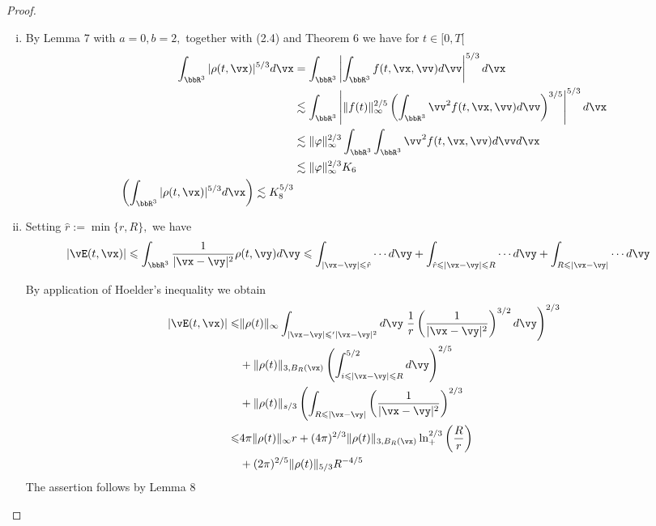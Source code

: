 \begin{proof}
    \begin{enumerate}[(i)]
        \item By Lemma 7 with $a=0, b=2,$ together with (2.4) and Theorem 6 we have for $t \in[0, T[$
        \[
        \begin{aligned}
        \int_{\bbR^{3}}|\rho(t, \vx)|^{5 / 3} d \vx &=\int_{\bbR^{3}}\left|\int_{\bbR^{3}} f(t, \vx, \vv) d \vv\right|^{5 / 3} d \vx \\
        & \lesssim \int_{\bbR^{3}}\left|\|f(t)\|_{\infty}^{2 / 5}\left(\int_{\bbR^{3}} \vv^{2} f(t, \vx, \vv) d \vv\right)^{3 / 5}\right|^{5 / 3} d \vx \\
        & \lesssim \|\varphi\|_{\infty}^{2 / 3} \int_{\bbR^{3}} \int_{\bbR^{3}} \vv^{2} f(t, \vx, \vv) d \vv d \vx \\
        & \lesssim \|\varphi\|_{\infty}^{2 / 3} K_{6}\\
        \left(\int_{\bbR^{3}}|\rho(t, \vx)|^{5 / 3} d \vx\right) \lesssim K_{8}^{5 / 3}
        \end{aligned}
        \]
        \item Setting $\hat{r}:=\min \{r, R\},$ we have
        \[
        \begin{aligned}
        |\vE(t, \vx)| & \leqslant \int_{\bbR^{3}} \frac{1}{|\vx-\vy|^{2}} \rho(t, \vy) d \vy  \leqslant \int_{|\vx-\vy| \leqslant \hat{r}} \cdots d \vy+\int_{\hat{r}\leqslant|\vx-\vy| \leqslant R} \cdots d \vy+\int_{R \leqslant|\vx-\vy|} \cdots d \vy
        \end{aligned}
        \]
        
        By application of Hoelder's inequality we obtain
        \[
        \begin{aligned}
        |\vE(t, \vx)| \leqslant & \|\rho(t)\|_{\infty} \int_{|\vx-\vy| \leqslant^{\prime}|\vx-\vy|^{2}} d \vy \left.\frac{1}{r}\left(\frac{1}{|\vx-\vy|^{2}}\right)^{3 / 2} d \vy\right)^{2 / 3} \\
        &+\|\rho(t)\|_{3, B_{R}(\vx)}\left(\int_{i \leqslant|\vx-\vy| \leqslant R}^{5 / 2} d \vy\right)^{2 / 5} \\
        &+\|\rho(t)\|_{s / 3}\left(\int_{R \leqslant|\vx-\vy|}\left(\frac{1}{|\vx-\vy|^{2}}\right)^{2 / 3}\right.\\
        \leqslant & 4 \pi\|\rho(t)\|_{\infty} r+(4 \pi)^{2 / 3}\|\rho(t)\|_{3, B_{R}(\vx)} \ln_{+}^{2 / 3}\left(\frac{R}{r}\right) \\
        &+(2 \pi)^{2 / 5}\|\rho(t)\|_{5 / 3} R^{-4 / 5}
        \end{aligned}
        \]
        The assertion follows by Lemma 8
    \end{enumerate}
    
\end{proof}